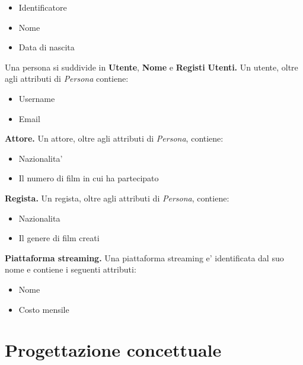 \documentclass[12pt,a4paper]{article}
\begin{document}
\begin{itemize}
    \item Identificatore
    \item Nome
    \item Data di nascita
\end{itemize}
Una persona si suddivide in \textbf{Utente}, \textbf{Nome} e \textbf{Registi}\newpage
\textbf{Utenti.} Un utente, oltre agli attributi di \textit{Persona} contiene:
\begin{itemize}
    \item Username
    \item Email
\end{itemize}
\textbf{Attore.} Un attore, oltre agli attributi di \textit{Persona}, contiene:
\begin{itemize}
    \item Nazionalita'
    \item Il numero di film in cui ha partecipato
\end{itemize}
\textbf{Regista.} Un regista, oltre agli attributi di \textit{Persona}, contiene:
\begin{itemize}
    \item Nazionalita
    \item Il genere di film creati
\end{itemize}
\textbf{Piattaforma streaming.} Una piattaforma streaming e' identificata dal suo nome e contiene i seguenti attributi:
\begin{itemize}
    \item Nome 
    \item Costo mensile
\end{itemize}
\section{Progettazione concettuale}
\end{document}
